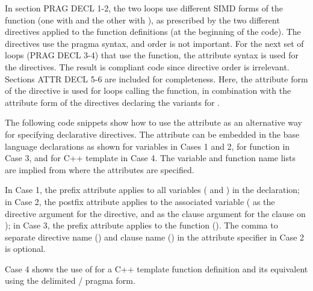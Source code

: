 \begin{ccppspecific}[4ex]
In section PRAG DECL 1-2, the two loops use different SIMD forms of the  function
(one with  and the other with ), 
as prescribed by the two different  directives
applied to the  function definitions (at the beginning of the code). 
The directives use the pragma syntax, and order is not important. 
For the next set of loops 
(PRAG DECL 3-4) that use the  function, the attribute syntax is 
used for the  directives. 
The result is compliant code since directive order is irrelevant.
Sections ATTR DECL 5-6 are included for completeness. Here, the attribute 
form of the  directive is used for loops calling the  function, 
in combination with the attribute form of the  
directives declaring the variants for .


The following code snippets show how to use the  attribute
as an alternative way for specifying declarative directives.
The  attribute can be embedded in the base
language declarations as shown for variables in Cases 1 and 2, 
for function in Case 3, and for C++ template in Case 4.
The variable and function name lists are implied from where
the attributes are specified.

In Case 1, the prefix attribute applies
to all variables ( and ) in the declaration;
in Case 2, the postfix attribute applies to the associated variable
( as the directive argument for the  directive,
and  as the clause argument for the  clause
on );
in Case 3, the prefix attribute applies to the function ().
The comma to separate directive name () and 
clause name () in
the  attribute specifier in Case 2 is optional.

Case 4 shows the use of  for 
a C++ template function definition
and its equivalent using the delimited
/ pragma form.

\end{ccppspecific}
